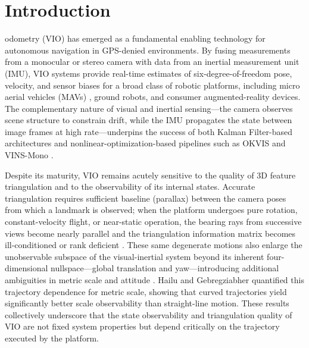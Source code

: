 \documentclass[journal]{IEEEtran}
\begin{document}
\IEEEpeerreviewmaketitle

\section{Introduction}
\label{introduction}

 odometry (VIO) has emerged as a fundamental enabling technology for autonomous navigation in GPS-denied environments. By fusing measurements from a monocular or stereo camera with data from an inertial measurement unit (IMU), VIO systems provide real-time estimates of six-degree-of-freedom pose, velocity, and sensor biases for a broad class of robotic platforms, including micro aerial vehicles (MAVs) \cite{delmerico2018benchmark}, ground robots, and consumer augmented-reality devices. The complementary nature of visual and inertial sensing---the camera observes scene structure to constrain drift, while the IMU propagates the state between image frames at high rate---underpins the success of both Kalman Filter-based architectures \cite{mourikis2007msckf, csanlan2025particle} and nonlinear-optimization-based pipelines such as OKVIS \cite{leutenegger2015okvis} and VINS-Mono \cite{qin2018vinsmono}.

Despite its maturity, VIO remains acutely sensitive to the quality of 3D feature triangulation and to the observability of its internal states. Accurate triangulation requires sufficient baseline (parallax) between the camera poses from which a landmark is observed; when the platform undergoes pure rotation, constant-velocity flight, or near-static operation, the bearing rays from successive views become nearly parallel and the triangulation information matrix becomes ill-conditioned or rank deficient \cite{wu2017unobs}. These same degenerate motions also enlarge the unobservable subspace of the visual-inertial system beyond its inherent four-dimensional nullspace---global translation and yaw---introducing additional ambiguities in metric scale and attitude \cite{hesch2014consistency, wu2017unobs, hernandez2015observability}. Hailu and Gebregziabher \cite{hailuquantifying} quantified this trajectory dependence for metric scale, showing that curved trajectories yield significantly better scale observability than straight-line motion. These results collectively underscore that the state observability and triangulation quality of VIO are not fixed system properties but depend critically on the trajectory executed by the platform.
\end{document}
